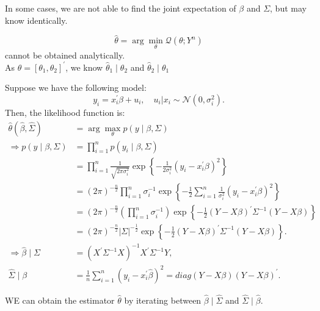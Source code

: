 In some cases, we are not able to find the joint expectation of $\beta$ and $\Sigma$, but may know identically.

\begin{eg}
    $$\hat{\theta} = \arg \min_{\theta} \mathcal{Q}(\theta; Y^n)$$ cannot be obtained analytically.\\
    As $\theta = [\theta_1, \theta_2]^{\prime}$, we know $\hat{\theta}_1 \mid \theta_2$ and $\hat{\theta}_2 \mid \theta_1$
\end{eg}

Suppose we have the following model:
\[
y_i = x_i^{\prime} \beta + u_i, \quad u_i|x_i \sim \mathcal{N}(0, \sigma_i^2).
\]
Then, the likelihood function is:
\begin{align*}
    \hat{\theta}\left(\hat{\beta}, \hat{\Sigma}\right) &= \arg \max_{\theta} p\left(y \mid \beta, \Sigma\right) \\
    \Rightarrow p\left(y \mid \beta, \Sigma\right) &= \prod_{i=1}^{n} p\left(y_i \mid \beta, \Sigma\right) \\
    &= \prod_{i=1}^{n} \frac{1}{\sqrt{2\pi \sigma_i^2}} \exp\left\{-\frac{1}{2\sigma_i^2} \left(y_i - x_i^{\prime} \beta\right)^2\right\} \\
    &= \left(2\pi\right)^{-\frac{n}{2}} \prod_{i=1}^{n} \sigma_i^{-1} \exp\left\{-\frac{1}{2} \sum_{i=1}^{n} \frac{1}{\sigma_i^2} \left(y_i - x_i^{\prime} \beta\right)^2\right\} \\
    &= \left(2\pi\right)^{-\frac{n}{2}} \left(\prod_{i=1}^{n} \sigma_i^{-1}\right) \exp\left\{-\frac{1}{2} \left(Y - X \beta\right)^{\prime} \Sigma^{-1} \left(Y - X \beta\right)\right\}\\
    &= \left(2\pi\right)^{-\frac{n}{2}} \vert \Sigma \vert ^{-\frac{1}{2}} \exp\left\{-\frac{1}{2} \left(Y - X \beta\right)^{\prime} \Sigma^{-1} \left(Y - X \beta\right)\right\}. \\
    \Rightarrow \hat{\beta} \mid \Sigma &= \left(X^{\prime} \Sigma^{-1} X\right)^{-1}X^{\prime} \Sigma^{-1}Y,\\
    \hat{\Sigma} \mid \beta &= \frac{1}{n} \sum_{i=1}^{n} \left(y_i - x_i^{\prime} \hat{\beta}\right)^2 = diag{(Y-X \beta)(Y - X \beta)^{\prime}}.
\end{align*}

WE can obtain the estimator $\hat{\theta}$ by iterating between $\hat{\beta} \mid \hat{\Sigma}$ and $\hat{\Sigma} \mid \hat{\beta}$.

